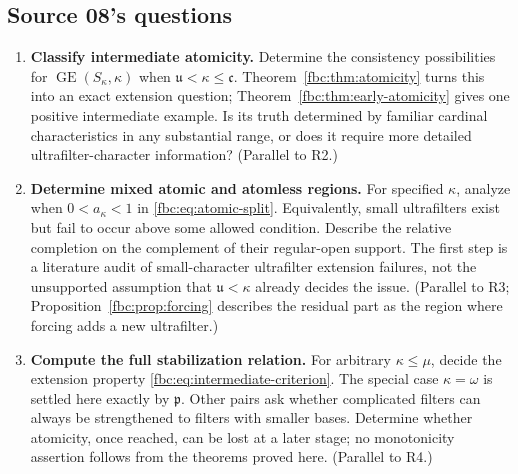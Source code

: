\documentclass[11pt,letterpaper]{article}
\theoremstyle{definition}
\theoremstyle{remark}
\newcommand{\om}{\omega}
\newcommand{\cp}{\mathfrak p}
\newcommand{\cu}{\mathfrak u}
\newcommand{\cc}{\mathfrak c}
\newcommand{\GE}{\operatorname{GE}}
\begin{document}
\subsection{Source 08's questions}
\begin{enumerate}[label=\textbf{Q\arabic*.},leftmargin=3em]
\item \textbf{Classify intermediate atomicity.}
Determine the consistency possibilities for
$\GE(S_\kappa,\kappa)$ when $\cu<\kappa\leq\cc$.
Theorem~\ref{fbc:thm:atomicity} turns this into an exact extension
question; Theorem~\ref{fbc:thm:early-atomicity} gives one positive
intermediate example. Is its truth determined by familiar
cardinal characteristics in any substantial range, or does it
require more detailed ultrafilter-character information?
(Parallel to R2.)

\item \textbf{Determine mixed atomic and atomless regions.}
For specified $\kappa$, analyze when
$0<a_\kappa<1$ in \eqref{fbc:eq:atomic-split}. Equivalently, small
ultrafilters exist but fail to occur above some allowed condition.
Describe the relative completion on the complement of their
regular-open support. The first step is a literature audit of
small-character ultrafilter extension failures, not the unsupported
assumption that $\cu<\kappa$ already decides the issue.
(Parallel to R3; Proposition~\ref{fbc:prop:forcing} describes the
residual part as the region where forcing adds a new ultrafilter.)

\item \textbf{Compute the full stabilization relation.}
For arbitrary $\kappa\leq\mu$, decide the extension property
\eqref{fbc:eq:intermediate-criterion}. The special case
$\kappa=\om$ is settled here exactly by $\cp$. Other pairs ask
whether complicated filters can always be strengthened to filters
with smaller bases. Determine whether atomicity, once reached,
can be lost at a later stage; no monotonicity assertion follows
from the theorems proved here. (Parallel to R4.)


\end{enumerate}
\end{document}

